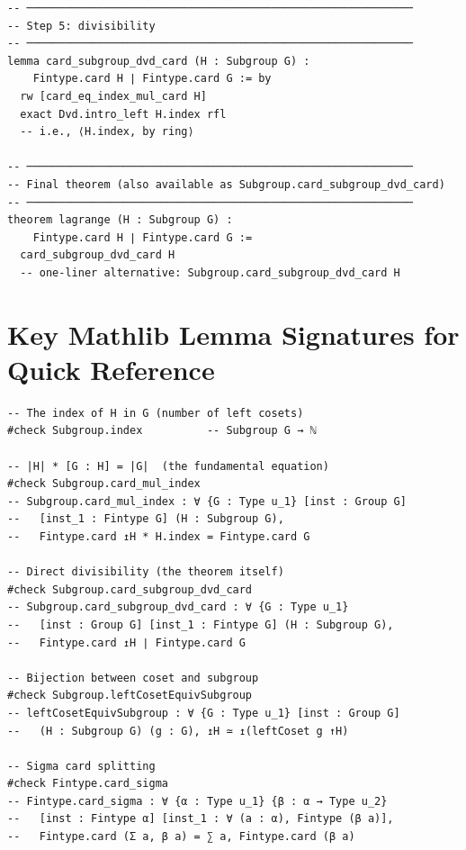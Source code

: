 \documentclass[11pt, a4paper]{article}
\theoremstyle{plain}
\theoremstyle{definition}
\begin{document}
\begin{lstlisting}
-- ────────────────────────────────────────────────────────────
-- Step 5: divisibility
-- ────────────────────────────────────────────────────────────
lemma card_subgroup_dvd_card (H : Subgroup G) :
    Fintype.card H ∣ Fintype.card G := by
  rw [card_eq_index_mul_card H]
  exact Dvd.intro_left H.index rfl
  -- i.e., ⟨H.index, by ring⟩

-- ────────────────────────────────────────────────────────────
-- Final theorem (also available as Subgroup.card_subgroup_dvd_card)
-- ────────────────────────────────────────────────────────────
theorem lagrange (H : Subgroup G) :
    Fintype.card H ∣ Fintype.card G :=
  card_subgroup_dvd_card H
  -- one-liner alternative: Subgroup.card_subgroup_dvd_card H
\end{lstlisting}

\section{Key Mathlib Lemma Signatures for Quick Reference}
\label{sec:signatures}

\begin{lstlisting}
-- The index of H in G (number of left cosets)
#check Subgroup.index          -- Subgroup G → ℕ

-- |H| * [G : H] = |G|  (the fundamental equation)
#check Subgroup.card_mul_index
-- Subgroup.card_mul_index : ∀ {G : Type u_1} [inst : Group G]
--   [inst_1 : Fintype G] (H : Subgroup G),
--   Fintype.card ↥H * H.index = Fintype.card G

-- Direct divisibility (the theorem itself)
#check Subgroup.card_subgroup_dvd_card
-- Subgroup.card_subgroup_dvd_card : ∀ {G : Type u_1}
--   [inst : Group G] [inst_1 : Fintype G] (H : Subgroup G),
--   Fintype.card ↥H ∣ Fintype.card G

-- Bijection between coset and subgroup
#check Subgroup.leftCosetEquivSubgroup
-- leftCosetEquivSubgroup : ∀ {G : Type u_1} [inst : Group G]
--   (H : Subgroup G) (g : G), ↥H ≃ ↥(leftCoset g ↑H)

-- Sigma card splitting
#check Fintype.card_sigma
-- Fintype.card_sigma : ∀ {α : Type u_1} {β : α → Type u_2}
--   [inst : Fintype α] [inst_1 : ∀ (a : α), Fintype (β a)],
--   Fintype.card (Σ a, β a) = ∑ a, Fintype.card (β a)
\end{lstlisting}

\end{document}
